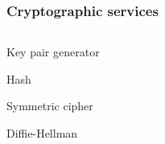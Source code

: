 \begin{frame}

\frametitle{Cryptographic services}

\begin{columns}

\begin{column}{0.5\textwidth}

\begin{block}{Key pair generator}


\end{block}

\begin{block}{Hash}


\end{block}



\begin{block}{Symmetric cipher}


\end{block}




\begin{block}{Diffie-Hellman}


\end{block}


\end{column}
\end{columns}
\end{frame}
